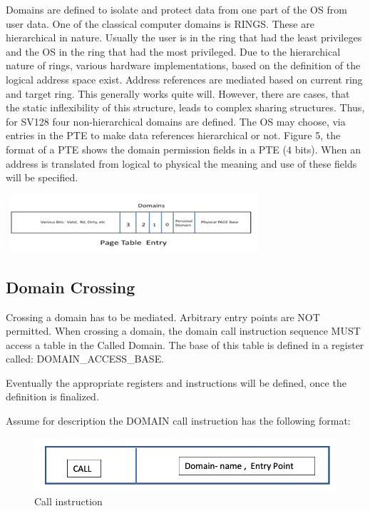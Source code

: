 \documentclass{article}
\begin{document}
Domains are defined to isolate and protect data from one part of the OS from user data.  One of the classical computer domains is RINGS.  These are hierarchical in nature.  Usually the user is in the ring that had the least privileges and the OS in the ring that had the most privileged.  Due to the hierarchical nature of rings,  various hardware implementations,  based on the definition of the logical address space exist.  Address references are mediated based on current   ring and target ring. This generally works quite will.  However, there are cases,  that the static inflexibility of this structure, leads to complex sharing structures.   Thus, for SV128 four non-hierarchical domains are defined. The OS may choose, via entries in the PTE to make data references hierarchical or not. Figure 5,  the format of a PTE shows the domain  permission fields in a PTE (4 bits).  When an address is translated from logical to physical the meaning and use of these fields will be specified.


\begin{center}
\includegraphics[scale = .9]
{figures/figure2b_pte.jpg}
\centering
\end{center}

\subsection{Domain Crossing}

Crossing a domain has to be mediated.  Arbitrary entry  points are NOT  permitted. When crossing a domain,  the domain call instruction sequence MUST access a table in the Called Domain. The base of this table is defined in a register called: DOMAIN\_ACCESS\_BASE. 

Eventually the appropriate registers and instructions will be defined, once the definition is finalized.


 Assume for description the DOMAIN call instruction has the following format:

\begin{figure}[h]
\includegraphics[scale=.4]{figures/figure3_call_instruction.jpg}
\caption{Call instruction}
\end{figure}
\end{document}
